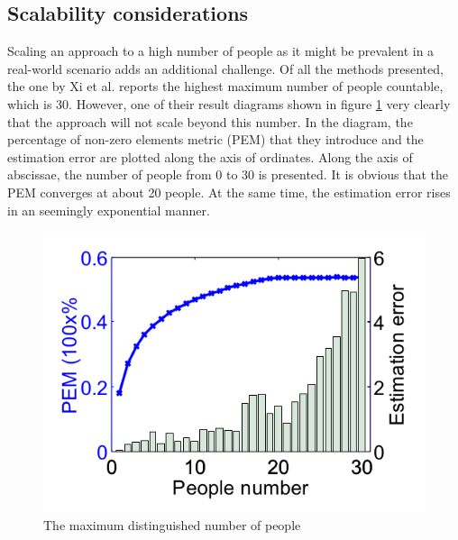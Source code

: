 \documentclass[conference]{IEEEtran}
\begin{document}
\subsection{Scalability considerations}
Scaling an approach to a high number of people as it might be prevalent in a real-world scenario adds an additional challenge. Of all the methods presented, the one by Xi et al. \cite{Xi} reports the highest maximum number of people countable, which is 30. However, one of their result diagrams shown in figure \ref{figFrogeyeConvergence} very clearly that the approach will not scale beyond this number. In the diagram, the percentage of non-zero elements metric (PEM) that they introduce and the estimation error are plotted along the axis of ordinates. Along the axis of abscissae, the number of people from 0 to 30 is presented. It is obvious that the PEM converges at about 20 people. At the same time, the estimation error rises in an seemingly exponential manner.
\begin{figure}[htbp]
\centerline{\includegraphics[scale=0.4]{figFrogeyeConvergence.PNG}}
\caption{The maximum distinguished number of people \cite{Xi}}
\label{figFrogeyeConvergence}
\end{figure}
\end{document}
